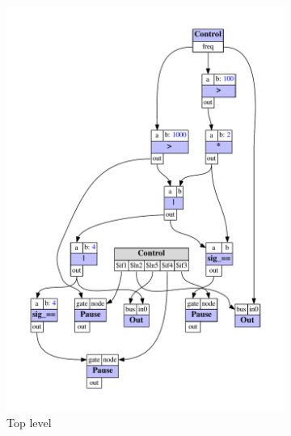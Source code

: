 \documentclass[11pt,a4paper]{article}
\begin{document}
\begin{figure}
\centering
\begin{subfigure}[b]{0.6\textwidth}%
\includegraphics[scale=0.5]{figures/ugen-if-mod-top.pdf}
\caption{Top level}\label{fig:ugen-mod-top}
\end{subfigure}
\begin{subfigure}[b]{0.3\textwidth}%

\end{subfigure}
\end{figure}
\end{document}
